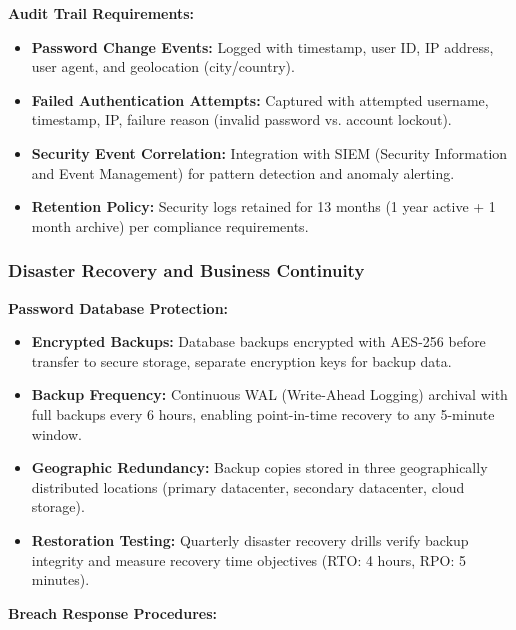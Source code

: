 \documentclass[12pt,a4paper]{article}
\begin{document}
\begin{tcolorbox}[colback=primaryblue!5, colframe=primaryblue, boxrule=1pt, arc=3pt, left=10pt, right=10pt, top=8pt, bottom=8pt]
\vspace{0.5em}

\textbf{Audit Trail Requirements:}

\begin{itemize}[leftmargin=2em, itemsep=6pt]
    \item \textbf{Password Change Events:} Logged with timestamp, user ID, IP address, user agent, and geolocation (city/country).
    \item \textbf{Failed Authentication Attempts:} Captured with attempted username, timestamp, IP, failure reason (invalid password vs. account lockout).
    \item \textbf{Security Event Correlation:} Integration with SIEM (Security Information and Event Management) for pattern detection and anomaly alerting.
    \item \textbf{Retention Policy:} Security logs retained for 13 months (1 year active + 1 month archive) per compliance requirements.
\end{itemize}

\subsubsection{Disaster Recovery and Business Continuity}

\textbf{Password Database Protection:}

\begin{itemize}[leftmargin=2em, itemsep=6pt]
    \item \textbf{Encrypted Backups:} Database backups encrypted with AES-256 before transfer to secure storage, separate encryption keys for backup data.
    \item \textbf{Backup Frequency:} Continuous WAL (Write-Ahead Logging) archival with full backups every 6 hours, enabling point-in-time recovery to any 5-minute window.
    \item \textbf{Geographic Redundancy:} Backup copies stored in three geographically distributed locations (primary datacenter, secondary datacenter, cloud storage).
    \item \textbf{Restoration Testing:} Quarterly disaster recovery drills verify backup integrity and measure recovery time objectives (RTO: 4 hours, RPO: 5 minutes).
\end{itemize}

\vspace{0.5em}

\textbf{Breach Response Procedures:}


\end{tcolorbox}
\end{document}
